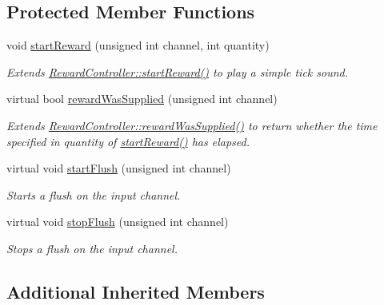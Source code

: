 \subsection*{Protected Member Functions}
\begin{DoxyCompactItemize}
\item 
\hypertarget{class_picto_1_1_audio_reward_controller_a4d4fb8f2856206f849f468deed212b72}{void \hyperlink{class_picto_1_1_audio_reward_controller_a4d4fb8f2856206f849f468deed212b72}{start\-Reward} (unsigned int channel, int quantity)}\label{class_picto_1_1_audio_reward_controller_a4d4fb8f2856206f849f468deed212b72}

\begin{DoxyCompactList}\small\item\em Extends \hyperlink{class_picto_1_1_reward_controller_a3e09bdba141632e89472bef42dc1e132}{Reward\-Controller\-::start\-Reward()} to play a simple tick sound. \end{DoxyCompactList}\item 
virtual bool \hyperlink{class_picto_1_1_audio_reward_controller_affe4b6d185b84d6e88821947c7d94d6e}{reward\-Was\-Supplied} (unsigned int channel)
\begin{DoxyCompactList}\small\item\em Extends \hyperlink{class_picto_1_1_reward_controller_a213ce91b8ef9019786e96e601d9641b9}{Reward\-Controller\-::reward\-Was\-Supplied()} to return whether the time specified in quantity of \hyperlink{class_picto_1_1_audio_reward_controller_a4d4fb8f2856206f849f468deed212b72}{start\-Reward()} has elapsed. \end{DoxyCompactList}\item 
virtual void \hyperlink{class_picto_1_1_audio_reward_controller_a03696b14900697ce67251029841f25f6}{start\-Flush} (unsigned int channel)
\begin{DoxyCompactList}\small\item\em Starts a flush on the input channel. \end{DoxyCompactList}\item 
virtual void \hyperlink{class_picto_1_1_audio_reward_controller_a08596b6393877a68bc176153bbd68c81}{stop\-Flush} (unsigned int channel)
\begin{DoxyCompactList}\small\item\em Stops a flush on the input channel. \end{DoxyCompactList}\end{DoxyCompactItemize}
\subsection*{Additional Inherited Members}


